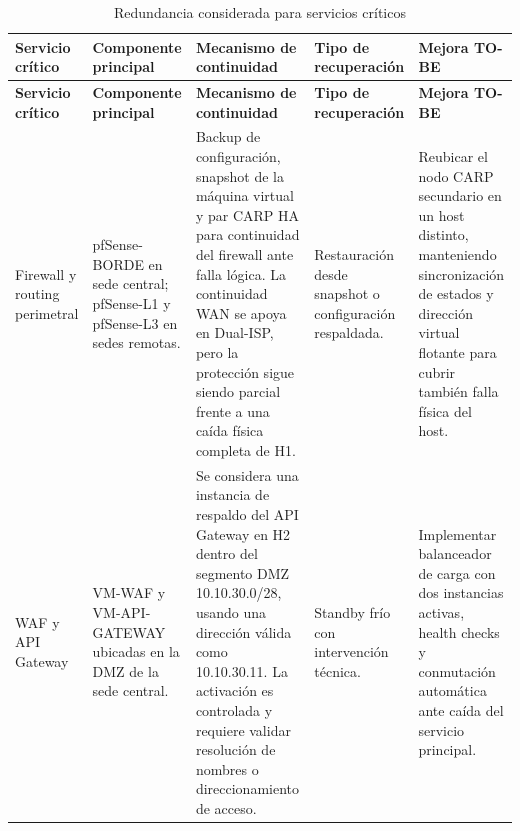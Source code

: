 \documentclass[11pt, a4paper, oneside]{report}
\begin{document}
\begin{landscape}
\thispagestyle{fancy}

\renewcommand{\arraystretch}{1.3}
\footnotesize
{}

\begin{xltabular}{\linewidth}{@{}|L{3cm}|L{4cm}|L{5.7cm}|L{3.1cm}|X|@{}}
\caption{Redundancia considerada para servicios críticos}
\label{tab:redundancia_servicios_criticos} \\

\parbox[c][1.1cm][c]{\linewidth}{\centering\color{white}\bfseries\small Servicio crítico} &
\parbox[c][1.1cm][c]{\linewidth}{\centering\color{white}\bfseries\small Componente principal} &
\parbox[c][1.1cm][c]{\linewidth}{\centering\color{white}\bfseries\small Mecanismo de continuidad} &
\parbox[c][1.1cm][c]{\linewidth}{\centering\color{white}\bfseries\small Tipo de recuperación} &
\parbox[c][1.1cm][c]{\linewidth}{\centering\color{white}\bfseries\small Mejora TO-BE} \\ \hline
\endfirsthead

\parbox[c][1.1cm][c]{\linewidth}{\centering\color{white}\bfseries\small Servicio crítico} &
\parbox[c][1.1cm][c]{\linewidth}{\centering\color{white}\bfseries\small Componente principal} &
\parbox[c][1.1cm][c]{\linewidth}{\centering\color{white}\bfseries\small Mecanismo de continuidad} &
\parbox[c][1.1cm][c]{\linewidth}{\centering\color{white}\bfseries\small Tipo de recuperación} &
\parbox[c][1.1cm][c]{\linewidth}{\centering\color{white}\bfseries\small Mejora TO-BE} \\ \hline
\endhead

\hline
\endfoot

{\small Firewall y routing perimetral} &
{\small pfSense-BORDE en sede central; pfSense-L1 y pfSense-L3 en sedes remotas.} &
{\small Backup de configuración, snapshot de la máquina virtual y par CARP HA para continuidad del firewall ante falla lógica. La continuidad WAN se apoya en Dual-ISP, pero la protección sigue siendo parcial frente a una caída física completa de H1.} &
{\small Restauración desde snapshot o configuración respaldada.} &
{\small Reubicar el nodo CARP secundario en un host distinto, manteniendo sincronización de estados y dirección virtual flotante para cubrir también falla física del host.} \\ \hline

{\small WAF y API Gateway} &
{\small VM-WAF y VM-API-GATEWAY ubicadas en la DMZ de la sede central.} &
{\small Se considera una instancia de respaldo del API Gateway en H2 dentro del segmento DMZ 10.10.30.0/28, usando una dirección válida como 10.10.30.11. La activación es controlada y requiere validar resolución de nombres o direccionamiento de acceso.} &
{\small Standby frío con intervención técnica.} &
{\small Implementar balanceador de carga con dos instancias activas, health checks y conmutación automática ante caída del servicio principal.} \\ \hline


\end{xltabular}
\end{landscape}
\end{document}
